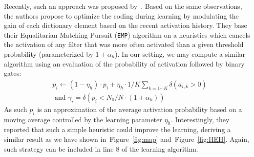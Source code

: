 \documentclass[vision,article,submit,oneauthor,pdftex]{Definitions/mdpi}
\newcommand{\seeFig}[1]{Figure~\ref{fig:#1}}%
\begin{document}
Recently, such an approach was proposed by~\cite{Sandin17}. Based on the same observations, the authors propose to optimize the coding during learning by modulating the gain of each dictionary element based on the recent activation history. They base their Equalitarian Matching Pursuit (\texttt{EMP}) algorithm on a heuristics which cancels the activation of any filter that was more often activated than a given threshold probability (parameterized by $1+\alpha_h$). In our setting, we may compute a similar algorithm using an evaluation of the probability of activation followed by binary gates:
\begin{align}%
&p_i \leftarrow (1- \eta_h ) \cdot p_i + \eta_h \cdot 1/K\sum_{k=1\cdots K} \delta(a_{i, k} > 0) \\ &\textrm{ and }
\gamma_i = \delta (p_i < N_0/N \cdot (1+\alpha_h) )
\end{align}%
As such $p_i$ is an approximation of the average activation probability based on a moving average controlled by the learning parameter $\eta_h$. 
Interestingly, they reported that such a simple heuristic could improve the learning, deriving a similar result as we have shown in~\seeFig{map} and~\seeFig{HEH}. %
Again, such strategy can be included in line 8 of the learning algorithm.
\end{document}
